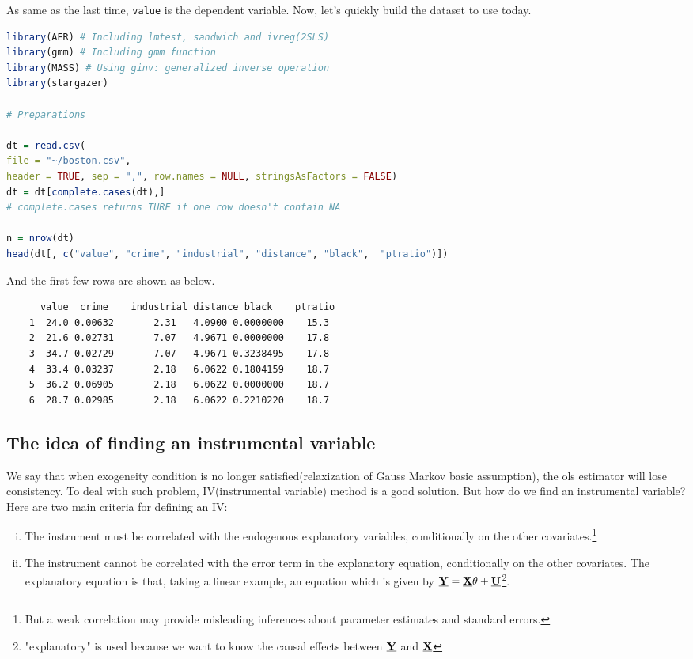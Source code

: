 \documentclass{article}
\theoremstyle{definition}
\begin{document}
As same as the last time, \texttt{value} is the dependent variable. Now, let's quickly build the dataset to use today.

\begin{lstlisting}[language=R]
library(AER) # Including lmtest, sandwich and ivreg(2SLS)
library(gmm) # Including gmm function
library(MASS) # Using ginv: generalized inverse operation
library(stargazer)

# Preparations 

dt = read.csv(
file = "~/boston.csv",
header = TRUE, sep = ",", row.names = NULL, stringsAsFactors = FALSE)
dt = dt[complete.cases(dt),] 
# complete.cases returns TURE if one row doesn't contain NA

n = nrow(dt)
head(dt[, c("value", "crime", "industrial", "distance", "black",  "ptratio")])
\end{lstlisting}

And the first few rows are shown as below.

\begin{verbatim}
	  value  crime    industrial distance black    ptratio
	1  24.0 0.00632       2.31   4.0900 0.0000000    15.3
	2  21.6 0.02731       7.07   4.9671 0.0000000    17.8
	3  34.7 0.02729       7.07   4.9671 0.3238495    17.8
	4  33.4 0.03237       2.18   6.0622 0.1804159    18.7
	5  36.2 0.06905       2.18   6.0622 0.0000000    18.7
	6  28.7 0.02985       2.18   6.0622 0.2210220    18.7
\end{verbatim}

\subsection{The idea of finding an instrumental variable}

We say that when exogeneity condition is no longer satisfied(relaxization of Gauss Markov basic assumption), the ols estimator will lose consistency. To deal with such problem, IV(instrumental variable) method is a good solution. But how do we find an instrumental variable? Here are two main criteria for defining an IV:

\begin{enumerate}[(i)]
\item
The instrument must be correlated with the endogenous explanatory variables, conditionally on the other covariates.\footnote{But a weak correlation may provide misleading inferences about parameter estimates and standard errors.\cite{Weak IV}}
\item
The instrument cannot be correlated with the error term in the explanatory equation, conditionally on the other covariates. The explanatory equation is that, taking a linear example, an equation which is given by $\textbf{\underline{Y}} = \textbf{\underline{X}}\theta + \textbf{\underline{U}}$\footnote{"explanatory" is used because we want to know the causal effects between $\textbf{\underline{Y}}$ and $\textbf{\underline{X}}$}.
\end{enumerate}
\end{document}
